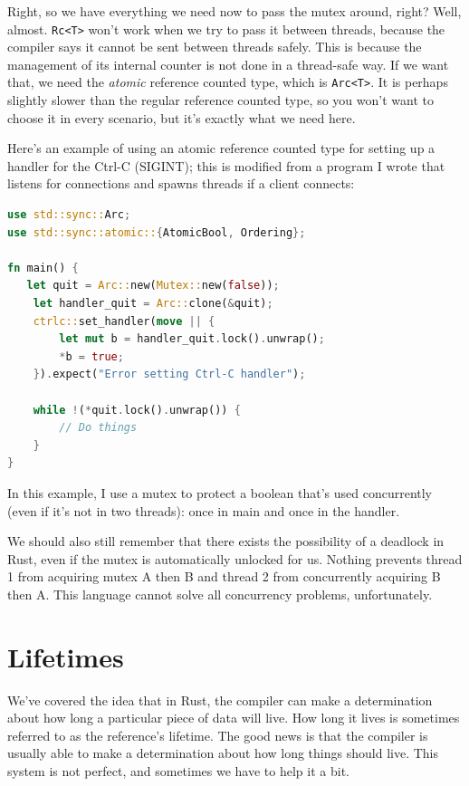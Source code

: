 \documentclass[a4paper]{report}
\begin{document}
Right, so we have everything we need now to pass the mutex around, right? Well, almost. \texttt{Rc<T>} won't work when we try to pass it between threads, because the compiler says it cannot be sent between threads safely. This is because the management of its internal counter is not done in a thread-safe way. If we want that, we need the \textit{atomic} reference counted type, which is \texttt{Arc<T>}. It is perhaps slightly slower than the regular reference counted type, so you won't want to choose it in every scenario, but it's exactly what we need here.

Here's an example of using an atomic reference counted type for setting up a handler for the Ctrl-C (SIGINT); this is modified from a program I wrote that listens for connections and spawns threads if a client connects: 

\begin{lstlisting}[language=Rust]
use std::sync::Arc;
use std::sync::atomic::{AtomicBool, Ordering};

fn main() {
   let quit = Arc::new(Mutex::new(false));
    let handler_quit = Arc::clone(&quit);
    ctrlc::set_handler(move || {
        let mut b = handler_quit.lock().unwrap();
        *b = true;
    }).expect("Error setting Ctrl-C handler");
 
    while !(*quit.lock().unwrap()) {
    	// Do things
    }
}
\end{lstlisting}

In this example, I use a mutex to protect a boolean that's used concurrently (even if it's not in two threads): once in main and once in the handler. 

We should also still remember that there exists the possibility of a deadlock in Rust, even if the mutex is automatically unlocked for us. Nothing prevents thread 1 from acquiring mutex A then B and thread 2 from concurrently acquiring B then A. This language cannot solve all concurrency problems, unfortunately.

\section*{Lifetimes}
We've covered the idea that in Rust, the compiler can make a determination about how long a particular piece of data will live. How long it lives is sometimes referred to as the reference's lifetime. The good news is that the compiler is usually able to make a determination about how long things should live. This system is not perfect, and sometimes we have to help it a bit.
\end{document}
